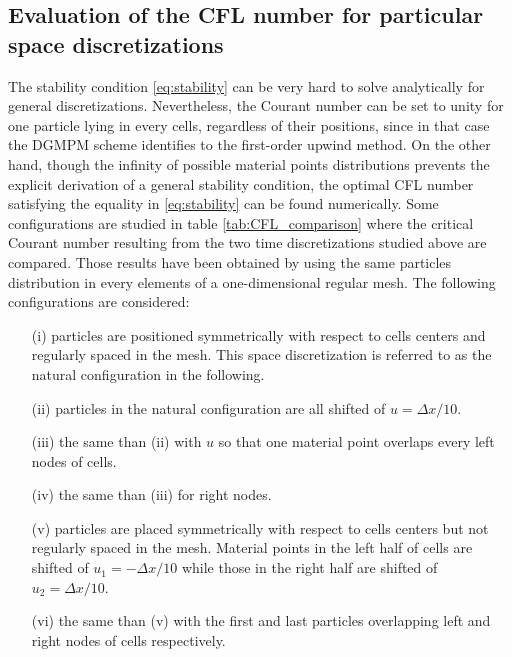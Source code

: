 \subsection{Evaluation of the CFL number for particular space discretizations}

The stability condition \eqref{eq:stability} can be very hard to solve analytically for general discretizations.
Nevertheless, the Courant number can be set to unity for one particle lying in every cells, regardless of their positions, since in that case the DGMPM scheme identifies to the first-order upwind method.
On the other hand, though the infinity of possible material points distributions prevents the explicit derivation of a general stability condition, the optimal CFL number satisfying the equality in \eqref{eq:stability} can be found numerically.
Some configurations are studied in table \ref{tab:CFL_comparison} where the critical Courant number resulting from the two time discretizations studied above are compared.
Those results have been obtained by using the same particles distribution in every elements of a one-dimensional regular mesh. 
%
The following configurations are considered:
\begin{itemize}
\item[(i)] particles are positioned symmetrically with respect to cells centers and regularly spaced in the mesh. This space discretization is referred to as the natural configuration in the following.
\item[(ii)] particles in the natural configuration are all shifted of $u=\Delta x/10$.
\item[(iii)] the same than (ii) with $u$ so that one material point overlaps every left nodes of cells.
\item[(iv)] the same than (iii) for right nodes.
\item[(v)] particles are placed symmetrically with respect to cells centers but not regularly spaced in the mesh. Material points in the left half of cells are shifted of $u_1=-\Delta x/10$ while those in the right half are shifted of $u_2=\Delta x/10$.
\item[(vi)] the same than (v) with the first and last particles overlapping left and right nodes of cells respectively.
\end{itemize}


